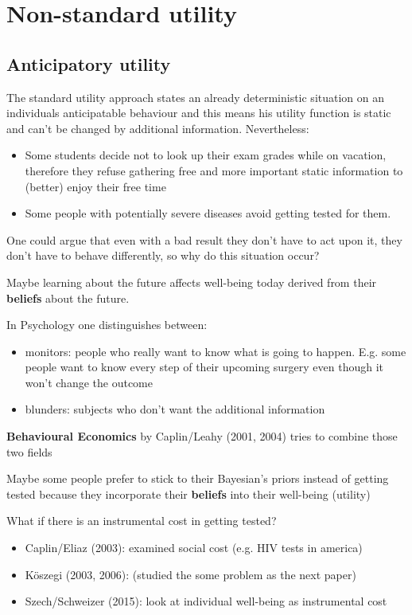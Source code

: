 
\chapter{Non-standard utility}


\section{Anticipatory utility}

The standard utility approach states an already deterministic situation on an individuals anticipatable behaviour and this means his utility function is static and can't be changed by additional information. Nevertheless:

\begin{itemize}
	\item Some students decide not to look up their exam grades while on vacation, therefore they refuse gathering free and more important static information to (better) enjoy their free time
	\item Some people with potentially severe diseases avoid getting tested for them.
\end{itemize}

One could argue that even with a bad result they don't have to act upon it, they don't have to behave differently, so why do this situation occur? 

Maybe learning about the future affects well-being today derived from their \textbf{beliefs} about the future.

In Psychology one distinguishes between:
\begin{itemize}
	\item monitors: people who really want to know what is going to happen. E.g. some people want to know every step of their upcoming surgery even though it won't change the outcome
	\item blunders: subjects who don't want the additional information
\end{itemize}

\textbf{Behavioural Economics} by Caplin/Leahy (2001, 2004) tries to combine those two fields

Maybe some people prefer to stick to their Bayesian's priors instead of getting tested because they incorporate their \textbf{beliefs} into their well-being (utility)
~\newline

What if there is an instrumental cost in getting tested?
\begin{itemize}
	\item Caplin/Eliaz (2003): examined social cost (e.g. HIV tests in america)
	\item Köszegi (2003, 2006): (studied the some problem as the next paper)
	\item Szech/Schweizer (2015): look at individual well-being as instrumental cost
\end{itemize}

